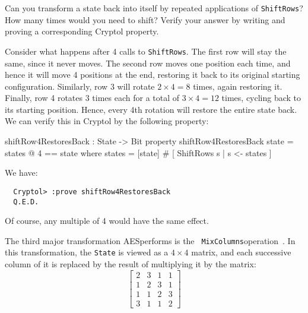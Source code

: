 \begin{Exercise}\label{ex:aesshiftrows:0}
  Can you transform a state back into itself by repeated applications
  of {\tt ShiftRows}? How many times would you need to shift?  Verify
  your answer by writing and proving a corresponding Cryptol property.
\end{Exercise}
\begin{Answer}
  Consider what happens after 4 calls to {\tt ShiftRows}. The first
  row will stay the same, since it never moves. The second row moves
  one position each time, and hence it will move 4 positions at the
  end, restoring it back to its original starting
  configuration. Similarly, row 3 will rotate $2\times4=8$ times,
  again restoring it. Finally, row 4 rotates 3 times each for a total
  of $3\times4 = 12$ times, cycling back to its starting
  position. Hence, every 4th rotation will restore the entire state
  back. We can verify this in Cryptol by the following property:
\begin{code}
  shiftRow4RestoresBack : State -> Bit
  property shiftRow4RestoresBack state = states @ 4 == state
     where states = [state] # [ ShiftRows s | s <- states ]
\end{code}
We have:
\begin{Verbatim}
  Cryptol> :prove shiftRow4RestoresBack
  Q.E.D.
\end{Verbatim}
Of course, any multiple of 4 would have the same effect.
\end{Answer}


The third major transformation AES\indAES performs is the {\tt
  MixColumns}\indAESMixColumns operation~\cite[section 5.1.3]{aes}.
In this transformation, the {\tt State} is viewed as a $4\times4$
matrix, and each successive column of it is replaced by the result of
multiplying it by the matrix:
$$
\left[ \begin{array}{cccc} 2 & 3 & 1 & 1 \\ 1 & 2 & 3 & 1 \\ 1 & 1 & 2 & 3 \\ 3 & 1 & 1 & 2 \end{array} \right]
$$

